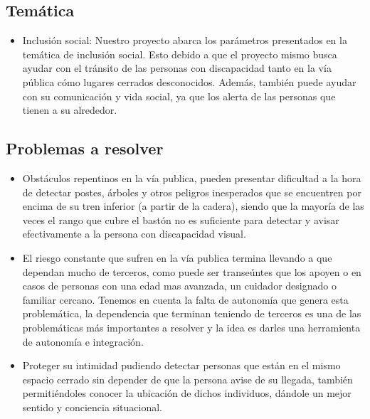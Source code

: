 \documentclass[12pt,a4paper]{article}
\begin{document}
\subsection{Temática}

 \begin{itemize}
 \item Inclusión social: Nuestro proyecto abarca los parámetros presentados en la temática de inclusión social. Esto debido a que el proyecto mismo busca ayudar con el tránsito de las personas con discapacidad tanto en la vía pública cómo lugares cerrados desconocidos. Además, también puede ayudar con su comunicación y vida social, ya que los alerta de las personas que tienen a su alrededor. 
 \end{itemize}
 
\subsection{Problemas a resolver}

\begin{itemize}
\item Obstáculos repentinos en la vía publica, pueden presentar dificultad a la hora de detectar postes, árboles y otros peligros inesperados que se encuentren por encima de su tren inferior (a partir de la cadera), siendo que la mayoría de las veces el rango que cubre el bastón no es suficiente para detectar y avisar efectivamente a la persona con discapacidad visual.
\item El riesgo constante que sufren en la vía publica termina llevando a que dependan mucho de terceros, como puede ser transeúntes que los apoyen o en casos de personas con una edad mas avanzada, un cuidador designado o familiar cercano. Tenemos en cuenta la falta de autonomía que genera esta problemática, la dependencia que terminan teniendo de terceros es una de las problemáticas más importantes a resolver y la idea es darles una herramienta de autonomía e integración.
\item Proteger su intimidad pudiendo detectar personas que están en el mismo espacio cerrado sin depender de que la persona avise de su llegada, también permitiéndoles conocer la ubicación de dichos individuos, dándole un mejor sentido y conciencia situacional.
\end{itemize}
\end{document}
